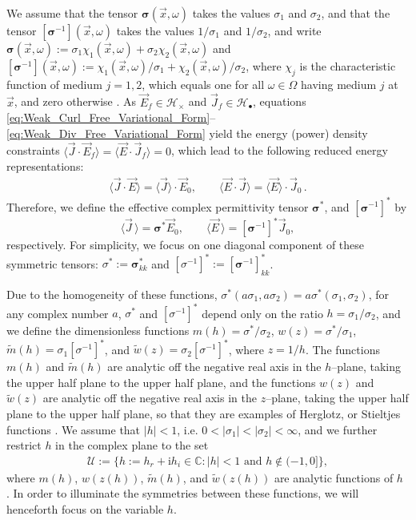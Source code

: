 \documentclass[english,12pt,jmp,graphicx]{revtex4-1}
\newcommand{\I}{\mathrm{i}}
\begin{document}
We assume that the tensor $\bm{\sigma}(\vec{x},\omega)$ takes the values $\sigma_1$
and $\sigma_2$, and that the tensor $[\bm{\sigma}^{-1}](\vec{x},\omega)$ takes the
values $1/\sigma_1$ and $1/\sigma_2$, and write 
$\bm{\sigma}(\vec{x},\omega):=\sigma_1\chi_1(\vec{x},\omega)+\sigma_2\chi_2(\vec{x},\omega)$ and
$[\bm{\sigma}^{-1}](\vec{x},\omega):=\chi_1(\vec{x},\omega)/\sigma_1+\chi_2(\vec{x},\omega)/\sigma_2$,
where $\chi_j$ is the characteristic function of medium $j=1,2$, which
equals one for all $\omega\in\Omega$ having medium $j$ at $\vec{x}$, and zero
otherwise \cite{Golden:CMP-473}. As $\vec{E}_f\in\mathscr{H}_\times$ and
$\vec{J}_f\in\mathscr{H}_{\bullet}$, equations
\eqref{eq:Weak_Curl_Free_Variational_Form}--\eqref{eq:Weak_Div_Free_Variational_Form}
yield the energy  (power) density constraints
$\langle\vec{J}\cdot\vec{E}_f\rangle=\langle\vec{E}\cdot\vec{J}_f\rangle=0$, which lead to the
following reduced energy representations:   
%
\begin{align}\label{eq:Reduced_System_Energy_Representations}
  \langle\vec{J}\cdot\vec{E}\rangle=\langle\vec{J}\rangle\cdot\vec{E}_0, \qquad
  \langle\vec{E}\cdot\vec{J}\rangle=\langle\vec{E}\rangle\cdot\vec{J}_0\,.
\end{align}
%
Therefore, we define the effective complex permittivity
tensor $\bm{\sigma}^*$, and $[\bm{\sigma}^{-1}]^*$ by 
%
\begin{equation}\label{eq:eff_eps_def}
    \langle \vec{J} \,\rangle=  \bm{\sigma}^* \vec{E}_0,\qquad
    \langle \vec{E} \,\rangle=  [\bm{\sigma}^{-1}]^*\vec{J}_0,
\end{equation}
%
respectively. For simplicity, we focus on one diagonal component of
these symmetric tensors: $\sigma^*:=\bm{\sigma}^*_{kk}$ and
$[\sigma^{-1}]^*:=[\bm{\sigma}^{-1}]^*_{kk}$.

Due to the homogeneity of these functions,
$\sigma^*(a\sigma_1,a\sigma_2)=a\sigma^*(\sigma_1,\sigma_2)$, for any complex number $a$, $\sigma^*$ and
$[\sigma^{-1}]^*$ depend only on the ratio $h = \sigma_1/\sigma_2$, and we define the
dimensionless functions $m(h)=\sigma^*/\sigma_2$, $w(z)=\sigma^*/\sigma_1$,
$\tilde{m}(h)=\sigma_1[\sigma^{-1}]^*$, and $\tilde{w}(z)=\sigma_2[\sigma^{-1}]^*$, where 
$z=1/h$. The functions $m(h)$ and $\tilde{m}(h)$ are analytic off the
negative real axis in the $h$--plane, taking the upper half plane to
the upper half plane, and the functions $w(z)$ and $\tilde{w}(z)$ are
analytic off the negative real axis in the $z$--plane, taking the
upper half plane to the upper half plane, so that they are examples of
Herglotz, or Stieltjes functions \cite{Golden:CMP-473}. We assume that
$|h|<1$, i.e. $0<|\sigma_1|<|\sigma_2|<\infty$, and we further restrict $h$ in the
complex plane to the set    
%
\begin{align}\label{eq:h_Domain}
  \mathcal{U}:=\{h:=h_r+\I h_i\in\mathbb{C}: |h|<1 \text{ and } h\not\in(-1,0]\},
\end{align}
%
where $m(h)$, $w(z(h))$, $\tilde{m}(h)$, and $\tilde{w}(z(h))$ are
analytic functions of $h$ \cite{Golden:CMP-473}. In order to
illuminate the symmetries between these functions, we will henceforth
focus on the variable $h$.
\end{document}
